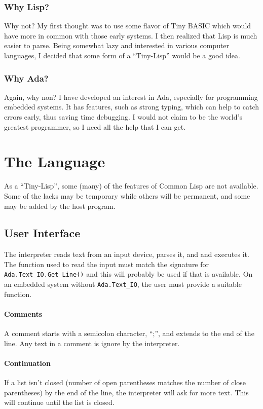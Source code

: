 \documentclass[10pt, openany]{book}
\newcommand{\package}[1]{\texttt{#1}}
\newcommand{\function}[1]{\texttt{#1}}
\begin{document}
\subsection{Why Lisp?}
Why not?  My first thought was to use some flavor of Tiny BASIC which would have more in common with those early systems.  I then realized that Lisp is much easier to parse.  Being somewhat lazy and interested in various computer languages, I decided that some form of a ``Tiny-Lisp'' would be a good idea.

\subsection{Why Ada?}
Again, why non?  I have developed an interest in Ada, especially for programming embedded systems.  It has features, such as strong typing, which can help to catch errors early, thus saving time debugging.  I would not claim to be the world's greatest programmer, so I need all the help that I can get.

\chapter{The Language}
As a ``Tiny-Lisp'', some (many) of the features of Common Lisp are not available.  Some of the lacks may be temporary while others will be permanent, and some may be added by the host program.

\section{User Interface}
The interpreter reads text from an input device, parses it, and and executes it.  The function used to read the input must match the signature for \function{Ada.Text\_IO.Get\_Line()} and this will probably be used if that is available.  On an embedded system without \package{Ada.Text\_IO}, the user must provide a suitable function.

\subsubsection{Comments}
A comment starts with a semicolon character, ``;'', and extends to the end of the line.  Any text in a comment is ignore by the interpreter.

\subsubsection{Continuation}
If a list isn't closed (number of open parentheses matches the number of close parentheses) by the end of the line, the interpreter will ask for more text.  This will continue until the list is closed.
\end{document}
